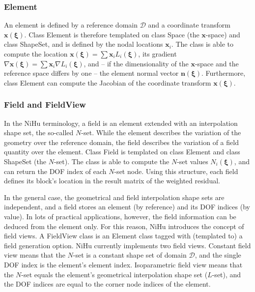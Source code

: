 \documentclass[review]{elsarticle}
\begin{document}
\subsubsection{Element}

An element is defined by a reference domain $\mathcal{D}$ and a coordinate transform $\bm{x}(\bm{\xi})$.
Class Element is therefore templated on class Space (the $\bm{x}$-space) and class ShapeSet, and is defined by the nodal locations $\bm{x}_i$.
The class is able to compute the location $\bm{x}(\bm{\xi}) = \sum \bm{x}_i L_i(\bm{\xi})$, its gradient $\nabla \bm{x}(\bm{\xi})  = \sum \bm{x}_i \nabla L_i(\bm{\xi})$, and -- if the dimensionality of the $\bm{x}$-space and the reference space differs by one -- the element normal vector $\bm{n}(\bm{\xi})$.
Furthermore, class Element can compute the Jacobian of the coordinate transform $\bm{x}(\bm{\xi})$.

\subsubsection{Field and FieldView}

In the NiHu terminology, a field is an element extended with an interpolation shape set, the so-called $N$-set.
While the element describes the variation of the geometry over the reference domain, the field describes the variation of a field quantity over the element.
Class Field is templated on class Element and class ShapeSet (the $N$-set).
The class is able to compute the $N$-set values $N_i(\bm{\xi})$, and can return the DOF index of each $N$-set node.
Using this structure, each field defines its block's location in the result matrix of the weighted residual.

In the general case, the geometrical and field interpolation shape sets are independent, and a field stores an element (by reference) and its DOF indices (by value).
In lots of practical applications, however, the field information can be deduced from the element only.
For this reason, NiHu introduces the concept of field views.
A FieldView class is an Element class tagged with (templated to) a field generation option.
NiHu currently implements two field views.
Constant field view means that the $N$-set is a constant shape set of domain $\mathcal{D}$, and the single DOF index is the element's element index.
Isoparametric field view means that the $N$-set equals the element's geometrical interpolation shape set ($L$-set), and the DOF indices are equal to the corner node indices of the element.
\end{document}
